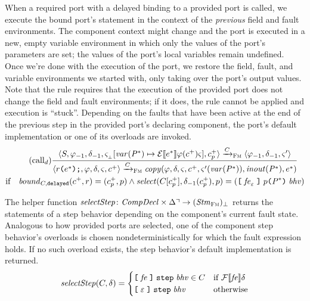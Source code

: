 \documentclass[a4paper,10pt,english]{article}
\begin{document}
When a required port with a delayed binding to a provided port is called, we execute the bound port's statement in the context of
the \textit{previous} field and fault environments. The component context might change and the port is executed in a new, empty
variable environment in which only the values of the port's parameters are set; the values of the port's local variables remain undefined. Once we're
done with the execution of the port, we restore the field, fault, and variable environments we started with, only
taking over the port's output values. Note that the rule requires that the execution of the provided port does not change the
field and fault environments; if it does, the rule cannot be applied and execution is ``stuck''. Depending on the faults that have
been active at the end of the previous step in the provided port's declaring component, the port's default
implementation or one of its overloads are invoked.
\begin{multline*}
	\tag{call${_d}$}
	\dfrac
	{
		\configurationFm{\stmFm, \fieldEnvPrev, \faultEnvPrev, \varEnvFmEmpty[\varof(\toList{\parameterDecl}) \mapsto
		\ExprSem{\toList{\expr}}\fieldEnv(\toListNE{\comp})\varEnvFm],
		\toListNE{\comp}_\provPort}
			\stmArrowFm
		\configurationFm{\fieldEnvPrev, \faultEnvPrev, \varEnvFm'}
	}
	{
		\configurationFm{\invokeReqPort{\reqPort}{\toList{\expr}}, \fieldEnv, \faultEnv, \varEnvFm, \toListNE{\comp}}
			\stmArrowFm
		\copyout(\fieldEnv, \faultEnv, \varEnvFm, \toListNE{\comp},
		\varEnvFm'(\varof(\toList{\parameterDecl})), \isinout(\toList{\parameterDecl}), \toList{\expr})
	}
	\\ \text{if} \quad \boundof_{\compDecl, \delayedBindingType}(\toListNE{\comp},
	\reqPort) = (\toListNE{\comp}_\provPort, \provPort) \wedge
	\select(\compDecl[\toListNE{\comp}_\provPort], \faultEnvPrev(\toListNE{\comp}_\provPort),
	\provPort) = (\provPortDeclSyn{\provPort}{\toList{\parameterDecl}}{\behavior}{\liftMissing{\faultExpr}})
\end{multline*}

The helper function $\mathit{selectStep} \colon \mathit{CompDecl} \times \Delta\urcorner \rightarrow
(\mathit{Stm}_\textsc{Fm})_\bot$ returns the statements of a step behavior depending on the component's current fault state. Analogous to
how provided ports are selected, one of the component step behavior's overloads is chosen nondeterministically for which the fault
expression holds. If no such overload exists, the step behavior's default implementation is returned.
\begin{equation*}
	\mathit{selectStep}(C, \delta) =
	\begin{cases}
		\texttt{[} \; \mathit{fe} \; \texttt{]} \; \texttt{step} \; \mathit{bhv} \in C & \text{if } \mathcal{F} \llbracket \mathit{fe} \rrbracket \delta
		\\
		\texttt{[} \; \varepsilon \; \texttt{]} \; \texttt{step} \; \mathit{bhv} & \text{otherwise}
	\end{cases} 
\end{equation*}
\end{document}
